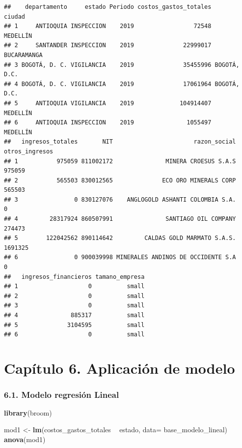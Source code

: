 \documentclass[
  11pt,
]{book}
\newenvironment{Shaded}{\begin{snugshade}}{\end{snugshade}}
\newcommand{\DataTypeTok}[1]{\textcolor[rgb]{0.13,0.29,0.53}{#1}}
\newcommand{\KeywordTok}[1]{\textcolor[rgb]{0.13,0.29,0.53}{\textbf{#1}}}
\newcommand{\NormalTok}[1]{#1}
\newcommand{\OperatorTok}[1]{\textcolor[rgb]{0.81,0.36,0.00}{\textbf{#1}}}
\newcommand{\StringTok}[1]{\textcolor[rgb]{0.31,0.60,0.02}{#1}}
\begin{document}
\begin{verbatim}
##    departamento     estado Periodo costos_gastos_totales       ciudad
## 1     ANTIOQUIA INSPECCION    2019                 72548     MEDELLÍN
## 2     SANTANDER INSPECCION    2019              22999017  BUCARAMANGA
## 3 BOGOTÁ, D. C. VIGILANCIA    2019              35455996 BOGOTÁ, D.C.
## 4 BOGOTÁ, D. C. VIGILANCIA    2019              17061964 BOGOTÁ, D.C.
## 5     ANTIOQUIA VIGILANCIA    2019             104914407     MEDELLÍN
## 6     ANTIOQUIA INSPECCION    2019               1055497     MEDELLÍN
##   ingresos_totales       NIT                       razon_social otros_ingresos
## 1           975059 811002172               MINERA CROESUS S.A.S         975059
## 2           565503 830012565              ECO ORO MINERALS CORP         565503
## 3                0 830127076    ANGLOGOLD ASHANTI COLOMBIA S.A.              0
## 4         28317924 860507991               SANTIAGO OIL COMPANY         274473
## 5        122042562 890114642         CALDAS GOLD MARMATO S.A.S.        1691325
## 6                0 900039998 MINERALES ANDINOS DE OCCIDENTE S.A              0
##   ingresos_financieros tamano_empresa
## 1                    0          small
## 2                    0          small
## 3                    0          small
## 4               885317          small
## 5              3104595          small
## 6                    0          small
\end{verbatim}

\hypertarget{capuxedtulo-6.-aplicaciuxf3n-de-modelo}{%
\chapter{Capítulo 6. Aplicación de
modelo}\label{capuxedtulo-6.-aplicaciuxf3n-de-modelo}}

\hypertarget{modelo-regresiuxf3n-lineal}{%
\subsection{6.1. Modelo regresión
Lineal}\label{modelo-regresiuxf3n-lineal}}

\begin{Shaded}
\begin{Highlighting}[]
\KeywordTok{library}\NormalTok{(broom)}

\NormalTok{mod1 <-}\StringTok{ }\KeywordTok{lm}\NormalTok{(costos_gastos_totales }\OperatorTok{~}\StringTok{  }\NormalTok{estado, }\DataTypeTok{data=}\NormalTok{ base_modelo_lineal) }
\KeywordTok{anova}\NormalTok{(mod1)}
\end{Highlighting}
\end{Shaded}
\end{document}
